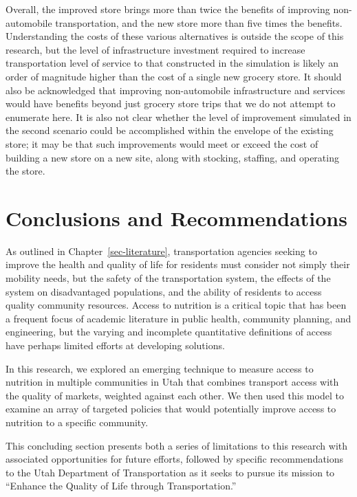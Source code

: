 \documentclass[
  letterpaper,
  DIV=11,
  numbers=noendperiod]{scrreport}
\begin{document}
Overall, the improved store brings more than twice the benefits of
improving non-automobile transportation, and the new store more than
five times the benefits. Understanding the costs of these various
alternatives is outside the scope of this research, but the level of
infrastructure investment required to increase transportation level of
service to that constructed in the simulation is likely an order of
magnitude higher than the cost of a single new grocery store. It should
also be acknowledged that improving non-automobile infrastructure and
services would have benefits beyond just grocery store trips that we do
not attempt to enumerate here. It is also not clear whether the level of
improvement simulated in the second scenario could be accomplished
within the envelope of the existing store; it may be that such
improvements would meet or exceed the cost of building a new store on a
new site, along with stocking, staffing, and operating the store.


\hypertarget{sec-conclude}{%
\chapter{Conclusions and Recommendations}\label{sec-conclude}}

As outlined in Chapter~\ref{sec-literature}, transportation agencies
seeking to improve the health and quality of life for residents must
consider not simply their mobility needs, but the safety of the
transportation system, the effects of the system on disadvantaged
populations, and the ability of residents to access quality community
resources. Access to nutrition is a critical topic that has been a
frequent focus of academic literature in public health, community
planning, and engineering, but the varying and incomplete quantitative
definitions of access have perhaps limited efforts at developing
solutions.

In this research, we explored an emerging technique to measure access to
nutrition in multiple communities in Utah that combines transport access
with the quality of markets, weighted against each other. We then used
this model to examine an array of targeted policies that would
potentially improve access to nutrition to a specific community.

This concluding section presents both a series of limitations to this
research with associated opportunities for future efforts, followed by
specific recommendations to the Utah Department of Transportation as it
seeks to pursue its mission to ``Enhance the Quality of Life through
Transportation.''
\end{document}
